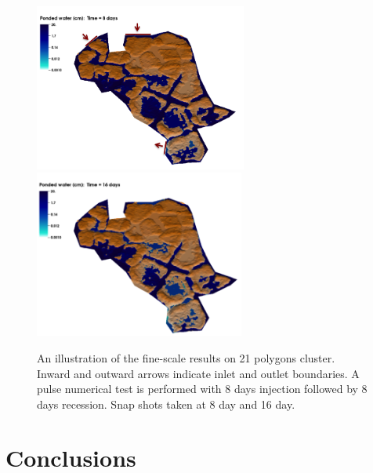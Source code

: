 \begin{figure}[!h]
\centering
\includegraphics[width=6.cm, height=5.5cm]{./figures/new-model/finescale-pulsetest-8days-1.png}
\includegraphics[width=6.cm, height=5.5cm]{./figures/new-model/finescale-pulsetest-16days-1.png}
\caption{An illustration of the fine-scale results on 21 polygons cluster. Inward and outward arrows indicate inlet and outlet boundaries. A pulse numerical test is performed with 8 days injection followed by 8 days recession. Snap shots taken at 8 day and 16 day.}
\label{lobster-pulsetest}
\end{figure}

%
\section{Conclusions}\label{conclusion}

